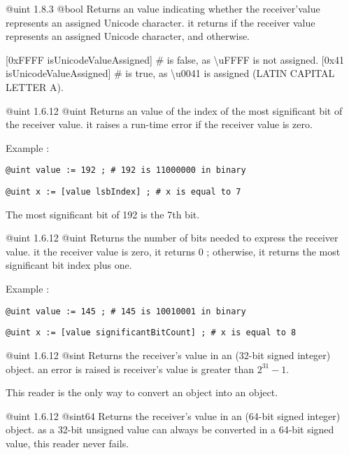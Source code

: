 {@uint}
{1.8.3}
{@bool}
{Returns an  value indicating whether the receiver'value represents an assigned Unicode character.}
{it returns  if the receiver value represents an assigned Unicode character,  and otherwise.}

\exempleDeuxLignes
{}
{[0xFFFF isUnicodeValueAssigned] \# is false, as \textbackslash uFFFF is not assigned.}
{[0x41 isUnicodeValueAssigned] \# is true, as \textbackslash u0041 is assigned (LATIN CAPITAL LETTER A).}



{@uint}
{1.6.12}
{@uint}
{Returns an  value of the index of the most significant bit of the receiver value.}
{it raises a run-time error if the receiver value is zero.}

Example :

\texttt{@uint value := 192 ; \# 192 is 11000000 in binary}

\texttt{@uint x := [value lsbIndex] ; \# x is equal to 7}

The most significant bit of 192 is the 7th bit.




{@uint}
{1.6.12}
{@uint}
{Returns the number of bits needed to express the receiver value.}
{it the receiver value is zero, it returns 0 ; otherwise, it returns the most significant bit index plus one.}

Example :

\texttt{@uint value := 145 ; \# 145 is 10010001 in binary}

\texttt{@uint x := [value significantBitCount] ; \# x is equal to 8}





{@uint}
{1.6.12}
{@sint}
{Returns the receiver's value in an  (32-bit signed integer) object.}
{an error is raised is receiver's value is greater than $2^{31}-1$.}

This reader is the only way to convert an  object into an  object.




{@uint}
{1.6.12}
{@sint64}
{Returns the receiver's value in an  (64-bit signed integer) object.}
{as a 32-bit unsigned value can always be converted in a 64-bit signed value, this reader never fails.}

